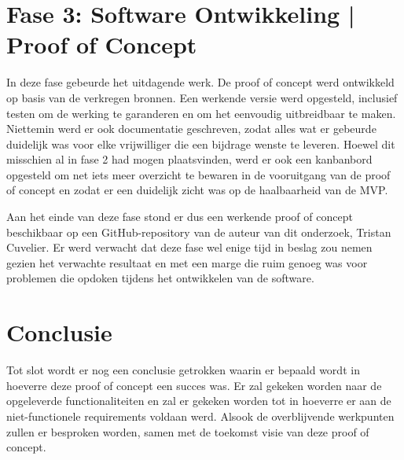 \section{Fase 3: Software Ontwikkeling | Proof of Concept}
In deze fase gebeurde het uitdagende werk. De proof of concept werd ontwikkeld op basis van de verkregen bronnen. Een werkende versie werd opgesteld, inclusief testen om de werking te garanderen en om het eenvoudig uitbreidbaar te maken. Niettemin werd er ook documentatie geschreven, zodat alles wat er gebeurde duidelijk was voor elke vrijwilliger die een bijdrage wenste te leveren. Hoewel dit misschien al in fase 2 had mogen plaatsvinden, werd er ook een kanbanbord opgesteld om net iets meer overzicht te bewaren in de vooruitgang van de proof of concept en zodat er een duidelijk zicht was op de haalbaarheid van de MVP.

Aan het einde van deze fase stond er dus een werkende proof of concept beschikbaar op een GitHub-repository van de auteur van dit onderzoek, Tristan Cuvelier. 
Er werd verwacht dat deze fase wel enige tijd in beslag zou nemen gezien het verwachte resultaat en met een marge die ruim genoeg was voor problemen die opdoken tijdens het ontwikkelen van de software.

\section{Conclusie}

Tot slot wordt er nog een conclusie getrokken waarin er bepaald wordt in hoeverre deze proof of concept een succes was. Er zal gekeken worden naar de opgeleverde functionaliteiten en zal er gekeken worden tot in hoeverre er aan de niet-functionele requirements voldaan werd. Alsook de overblijvende werkpunten zullen er besproken worden, samen met de toekomst visie van deze proof of concept.